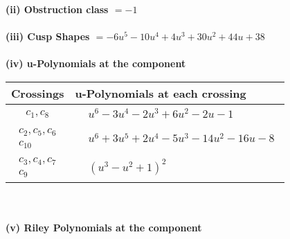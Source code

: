 \documentclass[1p]{elsarticle_modified}
\theoremstyle{definition}
\begin{document}
\flushleft \textbf{(ii) Obstruction class $= -1$}\\~\\
\flushleft \textbf{(iii) Cusp Shapes $= -6 u^5-10 u^4+4 u^3+30 u^2+44 u+38$}\\~\\
\newpage\renewcommand{\arraystretch}{1}
\flushleft \textbf{(iv) u-Polynomials at the component}\newline \\
\begin{tabular}{m{50pt}|m{274pt}}
Crossings & \hspace{64pt}u-Polynomials at each crossing \\
\hline $$\begin{aligned}c_{1},c_{8}\end{aligned}$$&$\begin{aligned}
&u^6-3 u^4-2 u^3+6 u^2-2 u-1
\end{aligned}$\\
\hline $$\begin{aligned}c_{2},c_{5},c_{6}\\c_{10}\end{aligned}$$&$\begin{aligned}
&u^6+3 u^5+2 u^4-5 u^3-14 u^2-16 u-8
\end{aligned}$\\
\hline $$\begin{aligned}c_{3},c_{4},c_{7}\\c_{9}\end{aligned}$$&$\begin{aligned}
&(u^3- u^2+1)^2
\end{aligned}$\\
\hline
\end{tabular}\\~\\
\newpage\renewcommand{\arraystretch}{1}
\flushleft \textbf{(v) Riley Polynomials at the component}\newline \\
\end{document}
